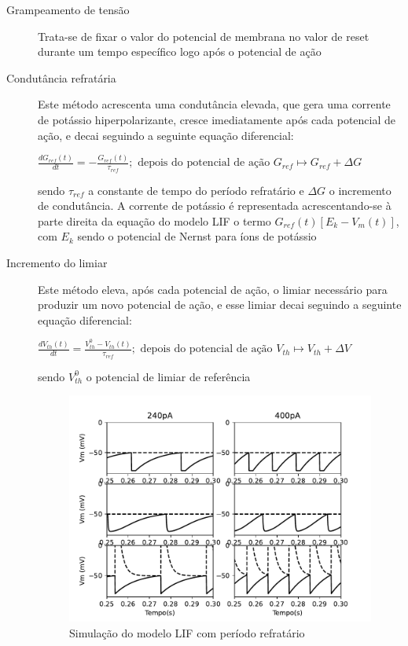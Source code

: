 \begin{description}
	\item[Grampeamento de tensão] Trata-se de fixar o valor do potencial de membrana no valor de reset durante um tempo específico logo após o potencial de ação
	
	\item[Condutância refratária] Este método acrescenta uma condutância elevada, que gera uma corrente de potássio hiperpolarizante, cresce imediatamente após cada potencial de ação, e decai seguindo a seguinte equação diferencial:
	
	$
	\frac{dG_{ref}(t)}{dt} = -\frac{G_{ref}(t)}{\tau_{ref}};\text{ depois do potencial de ação } G_{ref} \mapsto G_{ref} + \Delta G
	$
	
	sendo $\tau_{ref}$ a constante de tempo do período refratário e $\Delta G$ o incremento de condutância. A corrente de potássio é representada acrescentando-se à parte direita da equação do modelo LIF o termo $G_{ref}(t)[E_k-V_m(t)]$, com $E_k$ sendo o potencial de Nernst para íons de potássio
	
	\item[Incremento do limiar] Este método eleva, após cada potencial de ação, o limiar necessário para produzir um novo potencial de ação, e esse limiar decai seguindo a seguinte equação diferencial:
	
	$
	\frac{dV_{th}(t)}{dt} = \frac{V^0_{th}-V_{th}(t)}{\tau_{ref}};\text{ depois do potencial de ação } V_{th} \mapsto V_{th} + \Delta V
	$
	
	sendo $V^0_{th}$ o potencial de limiar de referência
	
	\begin{figure}[htb!]
		\centering
		\caption{Simulação do modelo LIF com período refratário}
		\label{fig:lifrefratario}
		\includegraphics[width=0.7\linewidth]{figs/lif_refratario}
	\end{figure}
	
\end{description}


